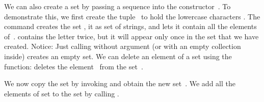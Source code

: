 %
We can also create a set by passing a sequence into the constructor~.
To demonstrate this, we first create the tuple~ to hold the lowercase characters .
The command  creates the set ,  it as set of strings, and lets it contain all the elements of~.
 contains the letter  twice, but it will appear only once in the set that we have created.
Notice: Just calling  without argument (or with an empty collection inside) creates an empty set.
We can delete an element of a set using the  function:
 deletes the element~ from the set~.

We now copy the set  by invoking  and obtain the new set~.
We add all the elements of set  to the set  by calling .

